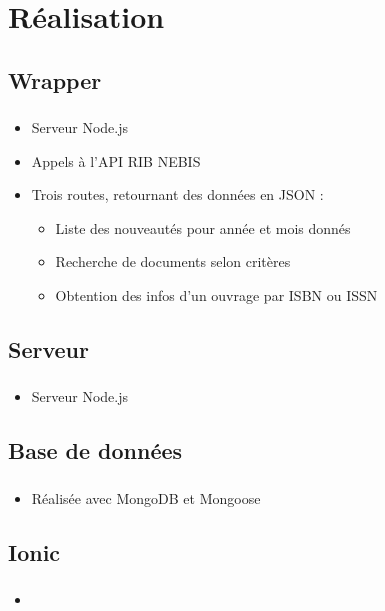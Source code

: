 \documentclass[10pt]{beamer}
\begin{document}
\section{Réalisation}
\subsection{Wrapper}
\begin{frame}
	\frametitle{\secname}
	\framesubtitle{\subsecname}
	\begin{itemize}
        \item Serveur Node.js
        \item Appels à l'API RIB NEBIS
        \item Trois routes, retournant des données en JSON :
        \begin{itemize}
            \item Liste des nouveautés pour année et mois donnés
            \item Recherche de documents selon critères
            \item Obtention des infos d'un ouvrage par ISBN ou ISSN
        \end{itemize}
    \end{itemize}
\end{frame}

\subsection{Serveur}
\begin{frame}
	\frametitle{\secname}
	\framesubtitle{\subsecname}
	\begin{itemize}
        \item Serveur Node.js
    \end{itemize}
\end{frame}

\subsection{Base de données}
\begin{frame}
	\frametitle{\secname}
	\framesubtitle{\subsecname}
	\begin{itemize}
        \item Réalisée avec MongoDB et Mongoose
    \end{itemize}
\end{frame}

\subsection{Ionic}
\begin{frame}
	\frametitle{\secname}
	\framesubtitle{\subsecname}
	\begin{itemize}
        \item 
    \end{itemize}
\end{frame}
\end{document}
